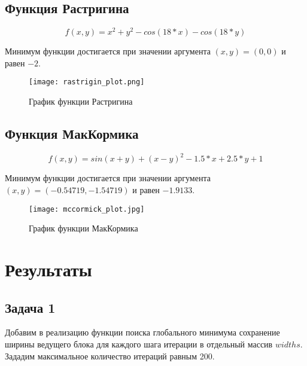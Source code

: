 \subsection{Функция Растригина}

\begin{equation}
	f(x,y) = x^2 + y^2 - cos(18 * x) - cos(18 * y)
\end{equation}

Минимум функции достигается при значении аргумента $(x,y)=(0,0)$ и равен $-2$.

\newpage

\begin{figure}[h]
	\centering
	\texttt{[image: rastrigin\_plot.png]}
	\caption{График функции Растригина}
\end{figure}

\subsection{Функция МакКормика}

\begin{equation}
	f(x,y) = sin(x + y) + (x - y)^2 - 1.5 * x + 2.5 * y + 1
\end{equation}

Минимум функции достигается при значении аргумента $(x,y)=(-0.54719,-1.54719)$ и равен $-1.9133$.

\newpage

\begin{figure}[h]
	\centering
	\texttt{[image: mccormick\_plot.jpg]}
	\caption{График функции МакКормика}
\end{figure}



\section{Результаты}

\subsection{Задача 1}

Добавим в реализацию функции поиска глобального минимума сохранение ширины ведущего блока для каждого шага итерации в отдельный массив $widths$.  \\

Зададим максимальное количество итераций равным 200. \\

